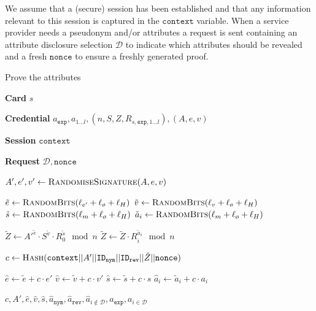 We assume that a (secure) session has been established and that any information relevant to this session is captured in the $\mathtt{context}$ variable. When a service provider needs a pseudonym and/or attributes a request is sent containing an attribute disclosure selection $\mathcal{D}$ to indicate which attributes should be revealed and a fresh $\mathtt{nonce}$ to ensure a freshly generated proof.

\begin{algorithm}
  \caption{Prove the attributes}
  \label{alg:proof}
  \addtolength{\baselineskip}{1mm}
  \begin{algorithmic}[1]

    \item[\textbf{Card}] $s$
    \item[\textbf{Credential}] $a_\mathtt{exp}, a_{1 \dots l}, (n, S, Z, R_{s, \mathtt{exp}, 1 \dots l}), (A, e, v)$
    \item[\textbf{Session}] $\mathtt{context}$
    \item[\textbf{Request}] $\mathcal{D}, \mathtt{nonce}$

    \Statex
      \State $A', e', v' \gets \Call{RandomiseSignature}{A, e, v}$

      \Statex {}
      \State $\tilde{e} \gets \Call{RandomBits}{\ell_{e'} + \ell_{\text{\o}} + \ell_{H}}$
      \State $\tilde{v} \gets \Call{RandomBits}{\ell_{v} + \ell_{\o} + \ell_{H}}$
      \State $\tilde{s} \gets \Call{RandomBits}{\ell_{m} + \ell_{\o} + \ell_{H}}$
       
        \State $\tilde{a}_i \gets \Call{RandomBits}{\ell_{m} + \ell_{\o} + \ell_{H}}$
      \EndFor

      \Statex {}
      \State $\tilde{Z} \gets {A'}^{\tilde{e}} \cdot S^{\tilde{v}} \cdot R_0^{\tilde{s}} \mod n$
       
        \State $\tilde{Z} \gets \tilde{Z} \cdot R_i^{\tilde{a}_i} \mod n$
      \EndFor

      \Statex {}
      \State $c \gets \Call{Hash}{\mathtt{context} || A' || \mathtt{ID_{nym}} || \mathtt{ID_{rev}} ||
        \tilde{Z} || \mathtt{nonce}}$

      \Statex {}
      \State $\hat{e} \gets \tilde{e} + c \cdot e'$
      \State $\hat{v} \gets \tilde{v} + c \cdot v'$
      \State $\hat{s} \gets \tilde{s} + c \cdot s$
       
        \State $\hat{a}_i \gets \tilde{a}_i + c \cdot a_i$
      \EndFor

      \Statex
      \Return $c, A', \hat{e}, \hat{v}, \hat{s}, \hat{a}_\mathtt{nym}, \hat{a}_\mathtt{rev}, \hat{a}_{i \notin \mathcal{D}}, a_\mathtt{exp}, a_{i \in \mathcal{D}}$
    \EndFunction
  \end{algorithmic}
\end{algorithm}

